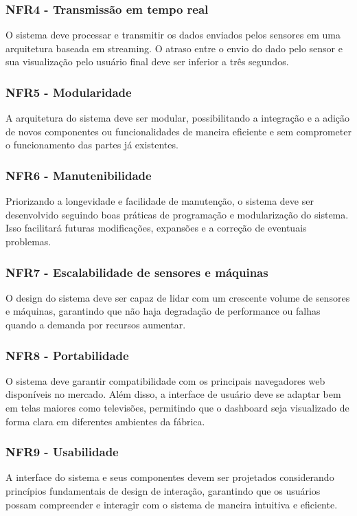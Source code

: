 \subsubsection{NFR4 - Transmissão em tempo real}
O sistema deve processar e transmitir os dados enviados pelos sensores em uma arquitetura baseada em streaming. O atraso entre o envio do dado pelo sensor e sua visualização pelo usuário final deve ser inferior a três segundos.

\subsubsection{NFR5 - Modularidade}
A arquitetura do sistema deve ser modular, possibilitando a integração e a adição de novos componentes ou funcionalidades de maneira eficiente e sem comprometer o funcionamento das partes já existentes.


\subsubsection{NFR6 - Manutenibilidade}
Priorizando a longevidade e facilidade de manutenção, o sistema deve ser desenvolvido seguindo boas práticas de programação e modularização do sistema. Isso facilitará futuras modificações, expansões e a correção de eventuais problemas.

\subsubsection{NFR7 - Escalabilidade de sensores e máquinas}
O design do sistema deve ser capaz de lidar com um crescente volume de sensores e máquinas, garantindo que não haja degradação de performance ou falhas quando a demanda por recursos aumentar.

\subsubsection{NFR8 - Portabilidade}
O sistema deve garantir compatibilidade com os principais navegadores web disponíveis no mercado. Além disso, a interface de usuário deve se adaptar bem em telas maiores como televisões, permitindo que o dashboard seja visualizado de forma clara em diferentes ambientes da fábrica.

\subsubsection{NFR9 - Usabilidade}
A interface do sistema e seus componentes devem ser projetados considerando princípios fundamentais de design de interação, garantindo que os usuários possam compreender e interagir com o sistema de maneira intuitiva e eficiente.



